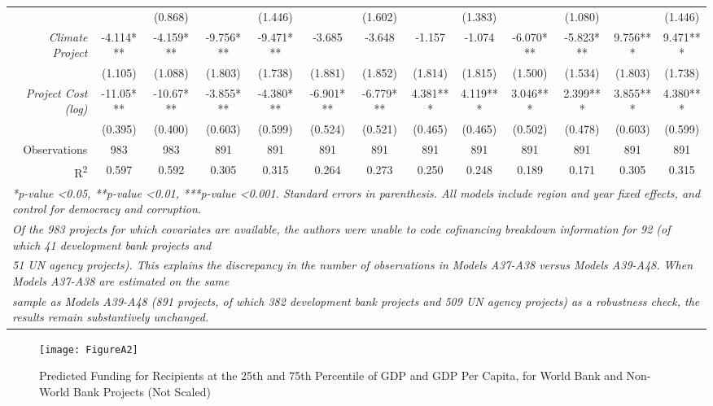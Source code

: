 \documentclass{article}
\begin{document}
\begin{singlespace}
\begin{landscape}
\begin{table}[H]
{\begin{tabular}{rcccccccccccc}
					\textit{} &  & (0.868) &  & (1.446) &  & (1.602) &  & (1.383) &  & (1.080) &  & (1.446) \\
					\textit{Climate Project} & -4.114*** & -4.159*** & -9.756*** & -9.471*** & -3.685 & -3.648 & -1.157 & -1.074 & -6.070*** & -5.823*** & 9.756*** & 9.471*** \\
					\textit{} & (1.105) & (1.088) & (1.803) & (1.738) & (1.881) & (1.852) & (1.814) & (1.815) & (1.500) & (1.534) & (1.803) & (1.738) \\
					\textit{Project Cost (log)} & -11.05*** & -10.67*** & -3.855*** & -4.380*** & -6.901*** & -6.779*** & 4.381*** & 4.119*** & 3.046*** & 2.399*** & 3.855*** & 4.380*** \\
					\textit{} & (0.395) & (0.400) & (0.603) & (0.599) & (0.524) & (0.521) & (0.465) & (0.465) & (0.502) & (0.478) & (0.603) & (0.599) \\ \hline
					Observations & 983 & 983 & 891 & 891 & 891 & 891 & 891 & 891 & 891 & 891 & 891 & 891 \\
					R\textsuperscript{2} & 0.597 & 0.592 & 0.305 & 0.315 & 0.264 & 0.273 & 0.250 & 0.248 & 0.189 & 0.171 & 0.305 & 0.315 \\ \hline
					\multicolumn{13}{l}{\textit{*p-value \textless 0.05, **p-value \textless 0.01, ***p-value \textless 0.001.  Standard errors in parenthesis. All models include region and year fixed effects, and control for democracy and corruption.}} \\
					\multicolumn{13}{l}{\textit{Of the 983 projects for which covariates are available, the authors were unable to code cofinancing breakdown information for 92 (of which 41 development bank projects and}} \\
					\multicolumn{13}{l}{\textit{51 UN agency projects). This explains the discrepancy in the number of observations in Models A37-A38 versus Models A39-A48. When Models A37-A38 are estimated on the same}} \\
					\multicolumn{13}{l}{\textit{sample as Models A39-A48 (891 projects, of which 382 development bank projects and 509 UN agency projects) as a robustness check, the results remain substantively unchanged.}}
				\end{tabular}%
			}
		\end{table}
	\end{landscape}
\end{singlespace}

\begin{figure}[H]
	\centering
	\caption{Predicted Funding for Recipients at the 25th and 75th Percentile of GDP and GDP Per Capita, for World Bank and Non-World Bank Projects (Not Scaled)}
	\texttt{[image: FigureA2]}
	\label{fig:figureA2}
\end{figure}
\end{document}
